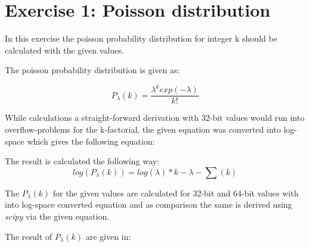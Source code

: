 \section{Exercise 1: Poisson distribution}

In this exercise the poisson probability distribution for integer k should be calculated with the given values.

The poisson probability distribution is given as:

\begin{equation}
	P_{\lambda}(k) = \frac{\lambda ^k exp(-\lambda)}{k!}
\end{equation}

While calculations a straight-forward derivation with 32-bit values would run into overflow-problems for the k-factorial, the given equation was converted into log-space which gives the following equation:
 
The result is calculated the following way:
\begin{equation}
	log(P_{\lambda}(k)) = log(\lambda ) *k - \lambda - \sum(k)
\end{equation}

The $P_{\lambda}(k)$ for the given values are calculated for 32-bit and 64-bit values with into log-space converted equation and as comparison the same is derived using \textit{scipy} via the given equation. 



The result of $P_{\lambda}(k)$ are given in:


